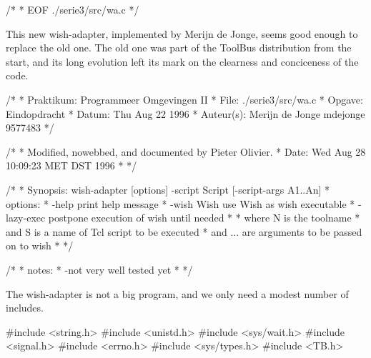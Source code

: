 /*
 * EOF ./serie3/src/wa.c
 */
\nwendcode{}\nwdocspar



This new wish-adapter, implemented by Merijn de Jonge, seems good
enough to replace the old one. The old one was part of the ToolBus
distribution from the start, and its long evolution left its mark
on the clearness and conciceness of the code.

\nwenddocs{}\endmoddef\let\nwnotused=\nwoutput{}\nwstartdeflinemarkup{}\nwenddeflinemarkup
/*
 * Praktikum: Programmeer Omgevingen II
 * File:      ./serie3/src/wa.c
 * Opgave:    Eindopdracht
 * Datum:     Thu Aug 22 1996
 * Auteur(s): Merijn de Jonge   mdejonge   9577483
*/

/*
 * Modified, nowebbed, and documented by Pieter Olivier.
 * Date:     Wed Aug 28 10:09:23 MET DST 1996
 * 
 */

/*
 * Synopsis: wish-adapter [options] -script Script [-script-args A1..An]
 * options:
 *      -help                 print help message
 *      -wish Wish            use Wish as wish executable
 *      -lazy-exec            postpone execution of wish until needed
 * 
 * where N is the toolname
 * and   S is a name of Tcl script to be executed
 * and   ... are arguments to be passed on to wish
 * 
 */

/*
 * notes:
 *    -not very well tested yet
 *
 */
\nwendcode{}\nwdocspar


The wish-adapter is not a big program, and we only need a 
modest number of includes.

\nwenddocs{}\endmoddef\let\nwnotused=\nwoutput{}\nwstartdeflinemarkup{}\nwenddeflinemarkup
#include <string.h>
#include <unistd.h>
#include <sys/wait.h>
#include <signal.h>
#include <errno.h>
#include <sys/types.h>
#include <TB.h>
\nwendcode{}\nwdocspar

